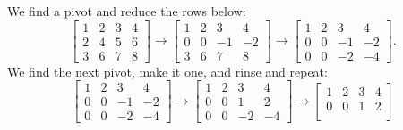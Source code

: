 \documentclass{ximera}
\begin{document}
\begin{exampleSol}
    We find a pivot and reduce the rows below:
    \begin{equation*}
    \begin{bmatrix}
        1 & 2 & 3 & 4 \\
        2 & 4 & 5 & 6 \\
        3 & 6 & 7 & 8
    \end{bmatrix} 
    \to
    \begin{bmatrix}
        1 & 2 & 3 & 4 \\
        0 & 0 & -1 & -2 \\
        3 & 6 & 7 & 8
    \end{bmatrix} 
    \to
    \begin{bmatrix}
        1 & 2 & 3 & 4 \\
        0 & 0 & -1 & -2 \\
        0 & 0 & -2 & -4
    \end{bmatrix} .
    \end{equation*}
    We find the next pivot, make it one, and rinse and repeat:
    \begin{equation*}
    \begin{bmatrix}
        1 & 2 & 3 & 4 \\
        0 & 0 & -1 & -2 \\
        0 & 0 & -2 & -4
    \end{bmatrix} 
    \to
    \begin{bmatrix}
        1 & 2 & 3 & 4 \\
        0 & 0 & 1 & 2 \\
        0 & 0 & -2 & -4
    \end{bmatrix} 
    \to
    \begin{bmatrix}
        1 & 2 & 3 & 4 \\
        0 & 0 & 1 & 2 \\

\end{bmatrix}
\end{equation*}
\end{exampleSol}
\end{document}
